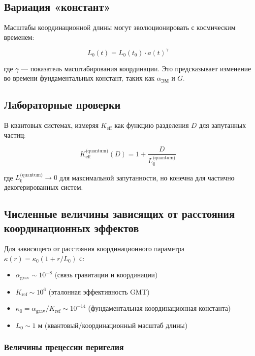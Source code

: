 \documentclass[11pt,a4paper]{article}
\begin{document}
	\subsection{Вариация «констант»}
	
	Масштабы координационной длины могут эволюционировать с космическим временем:
	
	\begin{equation}
		L_0(t) = L_0(t_0) \cdot a(t)^\gamma
	\end{equation}
	
	где $\gamma$ — показатель масштабирования координации. Это предсказывает 
	изменение во времени фундаментальных констант, таких как $\alpha_{\text{ЭМ}}$ и $G$.
	
	\subsection{Лабораторные проверки}
	
	В квантовых системах, измеряя $K_{\mathrm{eff}}$ как функцию 
	разделения $D$ для запутанных частиц:
	
	\begin{equation}
		K_{\mathrm{eff}}^{\text{(quantum)}}(D) = 1 + \frac{D}{L_0^{\text{(quantum)}}}
	\end{equation}
	
	где $L_0^{\text{(quantum)}} \to 0$ для максимальной запутанности, но 
	конечна для частично декогерированных систем.
	
	\subsection{Численные величины зависящих от расстояния координационных эффектов}
	\label{subsec:numerical-magnitudes}
	
	Для зависящего от расстояния координационного параметра $\kappa(r) = \kappa_0(1 + r/L_0)$ с:
	\begin{itemize}
		\item $\alpha_{\text{grav}} \sim 10^{-8}$ (связь гравитации и координации)
		\item $K_{\text{ref}} \sim 10^6$ (эталонная эффективность GMT)
		\item $\kappa_0 = \alpha_{\text{grav}}/K_{\text{ref}} \sim 10^{-14}$ (фундаментальная координационная константа)
		\item $L_0 \sim 1$ м (квантовый/координационный масштаб длины)
	\end{itemize}
	
	\subsubsection{Величины прецессии перигелия}
	
\end{document}
